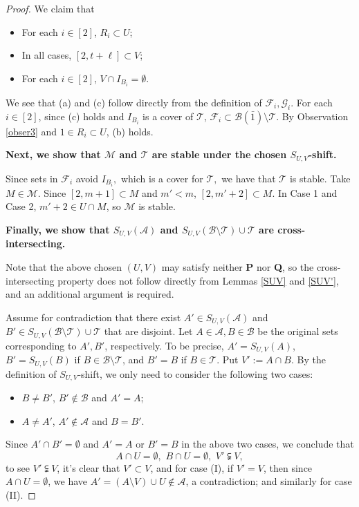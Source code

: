 \documentclass[11pt]{article}
\def\marrow{{\boldmath {\marginpar[\hfill$\rightarrow \rightarrow$]{$\leftarrow \leftarrow$}}}}
\def\andrey#1{{\sc Andrey: }{\marrow\sf \textcolor{blue}{#1}}}
\newcommand{\m}{\mathcal}
\begin{document}
\begin{proof}
We claim that
\begin{itemize}
    \item[(a)] For each $i\in [2]$, $R_i\subset U$; 
    \item[(b)] In all cases, $[2,t+\ell]\subset V$;
    \item[(c)] For each $i\in [2]$, $V\cap I_{B_i}=\emptyset.$
\end{itemize}

We see that (a) and (c)  follow directly from 
the definition of $\m F_i, \m G_i$. 
For each $i\in [2]$, since (c) holds and $I_{B_i}$ is a cover of $\m T$, $\m F_i\subset \m B(\bar 1)\setminus \m T$.
By Observation \ref{obser3} and $1\in R_i\subset U$, (b) holds. 

{\bf Next, we show that $\m M$ and $\m T$ are stable under the chosen $S_{U,V}$-shift. }

Since sets in $\m F_i$ avoid $I_{B_i},$ which is a cover for $\m T,$ we have that $\m T$ is stable. 
Take $M\in\m M$.
Since $[2,m+1]\subset M$ and $m'<m$, $[2,m'+2]\subset M $.
In Case 1 and Case 2, $m'+2\in U \cap M$, so $\m M$ is stable.

{\bf Finally,  we show that $S_{U,V}(\m A)$ and $S_{U,V}(\m B\setminus \m T)\cup \m T$
are cross-intersecting.} 

Note that the above chosen $(U,V)$ may satisfy neither {\bf P} nor {\bf Q}, so the cross-intersecting property does not follow directly from Lemmas \ref{SUV} and \ref{SUV'}, and an additional argument is required. 


Assume for contradiction that there exist $A'\in S_{U,V}(\m A)$ and $B'\in S_{U,V}(\m B\setminus \m T)\cup \m T$ that are disjoint.
Let $A\in \m A, B\in \m B$ be the original sets corresponding to $A', B'$, respectively. To be precise, $A'=S_{U,V}(A)$, $B'=S_{U,V}(B)$ if $B\in \m B\setminus \m T$, and  $B'=B$ if $B\in \m T$.
Put $V':=A\cap B$. 
By the definition of $S_{U,V}$-shift,
we only need to consider the following two cases:
\begin{itemize}
    \item[(I)] $B\ne B'$, $B'\not\in \m B$ and $A'=A$; 
    \item[(II)] $A\ne A'$, $A' \not\in \m A$ and $B=B'$.
\end{itemize}
Since $A'\cap B'=\emptyset$ and $A'=A$ or $B'=B$ in the above two cases,
we conclude that 
\[
A\cap U=\emptyset, \,\,B\cap U=\emptyset, \,\, V'\subsetneqq V,
\]
to see $V'\subsetneqq V$, it's clear that $V'\subset V$, and for case (I), if $V'=V$, then since $A\cap U=\emptyset$, we have $A'=(A\setminus V)\cup U\not\in \m A$, a contradiction; and similarly for case (II).


\end{proof}
\end{document}
